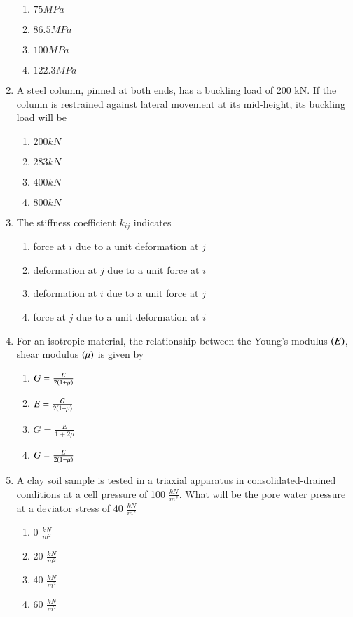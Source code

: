\documentclass[journal]{IEEEtran}
\begin{document}
\begin{enumerate}
\begin{enumerate}
			\item $75 MPa$
			\item $86.5 MPa$
			\item $100 MPa$
			\item $122.3 MPa$
		\end{enumerate}
	\item
	A steel column, pinned at both ends, has a buckling load of 200 kN. If the column is restrained against lateral movement at its mid-height, its buckling load will be 
		\begin{enumerate}
			\item $200 kN$
			\item $283 kN$
			\item $400 kN$
			\item $800 kN$
		\end{enumerate}
	\item
	The stiffness coefficient $k_{ij}$ indicates
		\begin{enumerate}
			\item force at $i$ due to a unit deformation at $j$
			\item deformation at $j$ due to a unit force at $i$
			\item deformation at $i$ due to a unit force at $j$
			\item force at $j$ due to a unit deformation at $i$
		\end{enumerate}
	\item
	For an isotropic material, the relationship between the Young's modulus $\left(E\right)$, shear modulus $\left(\mu\right)$ is given by 
		\begin{enumerate}
			\item $G = \frac{E}{2\left(1+\mu\right)}$
			\item $E = \frac{G}{2\left(1+\mu\right)}$
			\item $G = \frac{E}{1 + 2\mu}$
			\item $G = \frac{E}{2\left(1-\mu\right)}$
		\end{enumerate}
	\item
	A clay soil sample is tested in a triaxial apparatus in consolidated-drained conditions at a cell pressure of 100 $\frac{kN}{m^2}$. What will be the pore water pressure at a deviator stress of 40 $\frac{kN}{m^2}$
		\begin{enumerate}
			\item 0 $\frac{kN}{m^2}$
			\item 20 $\frac{kN}{m^2}$
			\item 40 $\frac{kN}{m^2}$
			\item 60 $\frac{kN}{m^2}$

\end{enumerate}
\end{enumerate}
\end{document}
